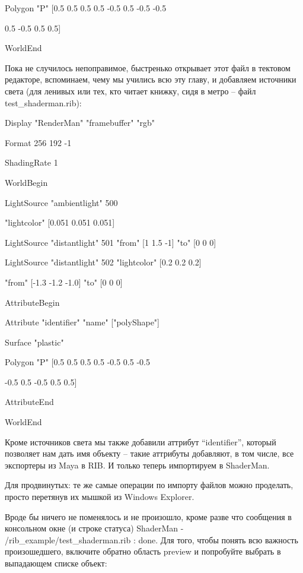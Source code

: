    Polygon "P" [0.5 0.5 0.5 0.5 -0.5 0.5 -0.5
    -0.5
  

                 0.5 -0.5 0.5 0.5]
  

 WorldEnd
  

 Пока не случилось непоправимое, быстренько
    открывает этот файл в тектовом редакторе, вспоминаем, чему мы
    учились всю эту главу, и добавляем источники света (для ленивых или
    тех, кто читает книжку, сидя в метро – файл
    test\_shaderman.rib):
  

Display
    "RenderMan" "framebuffer" "rgb"
  

Format
    256 192 -1
  

ShadingRate
    1
  

WorldBegin
  

     LightSource "ambientlight" 500
  

                 "lightcolor" [0.051 0.051 0.051]
  

     LightSource "distantlight" 501 "from" [1
    1.5 -1] "to" [0 0 0]
  

     LightSource "distantlight" 502
    "lightcolor" [0.2 0.2 0.2]
  

                 "from" [-1.3 -1.2 -1.0] "to" [0 0 0]
  

     AttributeBegin
  

       Attribute "identifier" "name"
    ["polyShape"]
  

       Surface "plastic"
  

       Polygon "P" [0.5 0.5 0.5 0.5
    -0.5 0.5 -0.5
  

  -0.5 0.5 -0.5 0.5 0.5]
  

     AttributeEnd
  

WorldEnd
  

 Кроме источников света мы также добавили аттрибут
    “identifier”, который позволяет нам дать имя объекту – такие
    аттрибуты добавляют, в том числе, все экспортеры из Maya в RIB. И
    только теперь импортируем в ShaderMan.
  

 Для
    продвинутых: те же самые операции
    по импорту файлов можно проделать, просто перетянув их мышкой из
    Windows Explorer.
  

 Вроде бы ничего не поменялось и не произошло, кроме
    разве что сообщения в консольном окне (и строке статуса) ShaderMan
    - /rib\_example/test\_shaderman.rib : done. Для того, чтобы понять
    всю важность произошедшего, включите обратно область preview и
    попробуйте выбрать в выпадающем списке объект:
  

